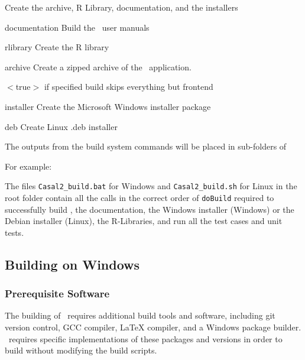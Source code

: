 Create the archive, R Library, documentation, and the installers
\begin{description}
  \item{documentation} Build the \CNAME\ user manuals
  \item{rlibrary} Create the R library
  \item{archive} Create a zipped archive of the \CNAME\ application.
  \begin{description}
     \item{$<$true$>$} if specified build skips everything but frontend
  \end{description}
  \item{installer} Create the Microsoft Windows installer package
  \item{deb} Create Linux .deb installer
\end{description}

The outputs from the build system commands will be placed in sub-folders of 

For example:





 The files \texttt{Casal2\_build.bat} for Windows and \texttt{Casal2\_build.sh} for Linux in the root folder contain all the calls in the correct order of \texttt{doBuild} required to successfully build \CNAME, the documentation, the Windows installer (Windows) or the Debian installer (Linux), the R-Libraries, and run all the test cases and unit tests.

\subsection{Building on Windows}

\subsubsection{Prerequisite Software}

The building of \CNAME\ requires additional build tools and software, including git version control, GCC compiler, LaTeX compiler, and a Windows package builder. \CNAME\ requires specific implementations of these packages and versions in order to build without modifying the build scripts.

